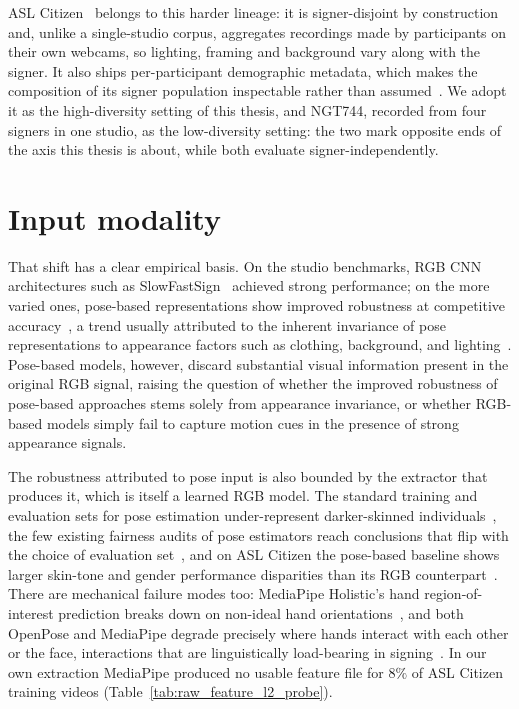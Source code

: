 ASL Citizen~\cite{aslcitizen} belongs to this harder lineage: it is
signer-disjoint by construction and, unlike a single-studio corpus,
aggregates recordings made by participants on their own webcams, so
lighting, framing and background vary along with the signer. It also
ships per-participant demographic metadata, which makes the composition
of its signer population inspectable rather than
assumed~\cite{atwellStudyingMitigatingBiases2024}. We adopt it as the
high-diversity setting of this thesis, and NGT744, recorded from four
signers in one studio, as the low-diversity setting: the two mark
opposite ends of the axis this thesis is about, while both evaluate
signer-independently.

\section{Input modality}
\label{sec:related-work-modality}
That shift has a clear empirical basis. On the studio benchmarks, RGB CNN
architectures such as
SlowFastSign~\cite{ahnSlowFastNetworkContinuous2023} achieved strong
performance; on the more varied ones, pose-based representations show
improved robustness at competitive
accuracy~\cite{minCloserLookSkeletonbased2025}, a trend usually
attributed to the inherent
invariance of pose representations to appearance factors such as clothing,
background, and
lighting~\cite{moryossefEvaluatingImmediateApplicability2021,
kratimenosIndependentSignLanguage2020, tranRegionAwarePoseModeling2025}.
Pose-based models, however, discard substantial
visual information present in the original RGB signal, raising the question
of whether the improved robustness of pose-based approaches stems solely
from appearance invariance, or whether RGB-based models simply fail to
capture motion cues in the presence of strong appearance signals.

The robustness attributed to pose input is also bounded by the extractor
that produces it, which is itself a learned RGB model. The standard
training and evaluation sets for pose estimation under-represent
darker-skinned individuals~\cite{lachanceCaseStudyFairness2023,
hasanHi5SyntheticData2024}, the few existing fairness audits of pose
estimators reach conclusions that flip with the choice of evaluation
set~\cite{lachanceCaseStudyFairness2023, xiangFairHumanCentricImage2025},
and on ASL Citizen the pose-based baseline shows larger skin-tone and
gender performance disparities than its RGB
counterpart~\cite{atwellStudyingMitigatingBiases2024}. There are
mechanical failure modes too: MediaPipe Holistic's hand
region-of-interest prediction breaks down on non-ideal hand
orientations~\cite{moryossefOptimizingHandRegion2024}, and both OpenPose
and MediaPipe degrade precisely where hands interact with each other or
the face, interactions that are linguistically load-bearing in
signing~\cite{moryossefEvaluatingImmediateApplicability2021}. In our own
extraction MediaPipe produced no usable feature file for $8\%$ of ASL
Citizen training videos (Table~\ref{tab:raw_feature_l2_probe}).

